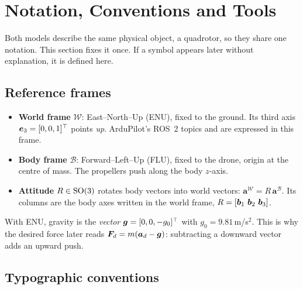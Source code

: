 \section{Notation, Conventions and Tools}
\label{sec:notation}

Both models describe the same physical object, a quadrotor, so they share one notation.
This section fixes it once. If a symbol appears later without explanation, it is defined here.

\subsection{Reference frames}

\begin{itemize}
  \item \textbf{World frame} $\mathcal{W}$: East--North--Up (ENU), fixed to the ground. Its third axis
        $\bm{e}_3=[0,0,1]^\top$ points \emph{up}. ArduPilot's ROS~2 topics  and
         are expressed in this frame.
  \item \textbf{Body frame} $\mathcal{B}$: Forward--Left--Up (FLU), fixed to the drone, origin at the centre
        of mass. The propellers push along the body $z$-axis.
  \item \textbf{Attitude} $R\in\mathrm{SO}(3)$ rotates body vectors into world vectors:
        $\bm a^{\mathcal W}=R\,\bm a^{\mathcal B}$. Its columns are the body axes written in the world frame,
        $R=[\bm{b}_1\ \bm{b}_2\ \bm{b}_3]$.
\end{itemize}

With ENU, gravity is the \emph{vector} $\bm{g}=[0,0,-g_0]^\top$ with $g_0=9.81$\,m/s$^2$. This is why
the desired force later reads $\bm{F}_d=m(\bm{a}_d-\bm{g})$: subtracting a downward vector adds an upward push.

\subsection{Typographic conventions}

